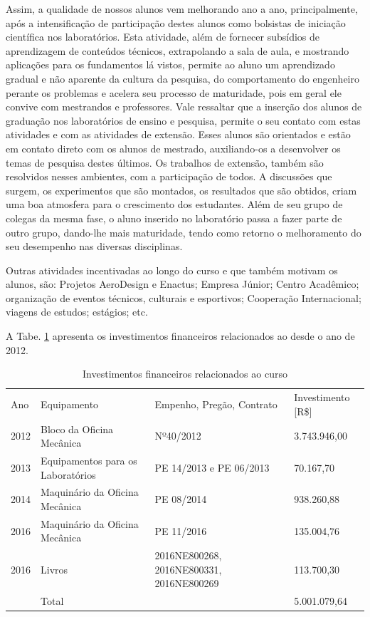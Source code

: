 \documentclass{paper}
\begin{document}
Assim, a qualidade de nossos alunos vem melhorando ano a ano, principalmente, após a intensificação de participação destes alunos como bolsistas de iniciação científica nos laboratórios. Esta atividade, além de fornecer subsídios de aprendizagem de conteúdos técnicos, extrapolando a sala de aula, e mostrando aplicações para os fundamentos lá vistos, permite ao aluno um aprendizado gradual e não aparente da cultura da pesquisa, do comportamento do engenheiro perante os problemas e acelera seu processo de maturidade, pois em geral ele convive com mestrandos e professores. Vale ressaltar que a inserção dos alunos de graduação nos laboratórios de ensino e pesquisa, permite o seu contato com estas atividades e com as atividades de extensão. Esses alunos são orientados e estão em contato direto com os alunos de mestrado, auxiliando-os a desenvolver os temas de pesquisa destes últimos. Os trabalhos de extensão, também são resolvidos nesses ambientes, com a participação de todos. A discussões que surgem, os experimentos que são montados, os resultados que são obtidos, criam uma boa atmosfera para o crescimento dos estudantes. Além de seu grupo de colegas da mesma fase, o aluno inserido no laboratório passa a fazer parte de outro grupo, dando-lhe mais maturidade, tendo como retorno o melhoramento do seu desempenho nas diversas disciplinas.

Outras atividades incentivadas ao longo do curso e que também motivam os alunos, são: Projetos AeroDesign e Enactus; Empresa Júnior; Centro Acadêmico; organização de eventos técnicos, culturais e esportivos; Cooperação Internacional; viagens de estudos; estágios; etc.

A Tabe. \ref{tab10} apresenta os investimentos financeiros relacionados ao \NOMECURSO desde o ano de 2012. 

    \begin{longtable}{|p{1.0cm}|p{6.0cm}|p{3.0cm}|p{3.0cm}|}
    
    \caption{Investimentos financeiros relacionados ao curso}\label{tab10} 
    \vspace{-0.25cm}
    
    \\ \hline 
    \cellcolor{\cinza}Ano & \cellcolor{\cinza}Equipamento & \cellcolor{\cinza}Empenho, Pregão, Contrato & \cellcolor{\cinza}Investimento [R\$]  \\ 
    \hline
     2012 &  Bloco da Oficina Mecânica & Nº40/2012  &  3.743.946,00 \\ \hline
     2013 &  Equipamentos para os Laboratórios  & PE 14/2013 e PE 06/2013 &  70.167,70 \\ \hline
     2014 &  Maquinário da Oficina Mecânica & PE 08/2014 &  938.260,88 \\ \hline
     2016 &  Maquinário da Oficina Mecânica  & PE 11/2016 & 135.004,76 \\ \hline
     2016 &  Livros & 2016NE800268, 2016NE800331, 2016NE800269 &  113.700,30 \\ \hline
      &  Total & & 5.001.079,64 \\ \hline
   \end{longtable}
\end{document}
